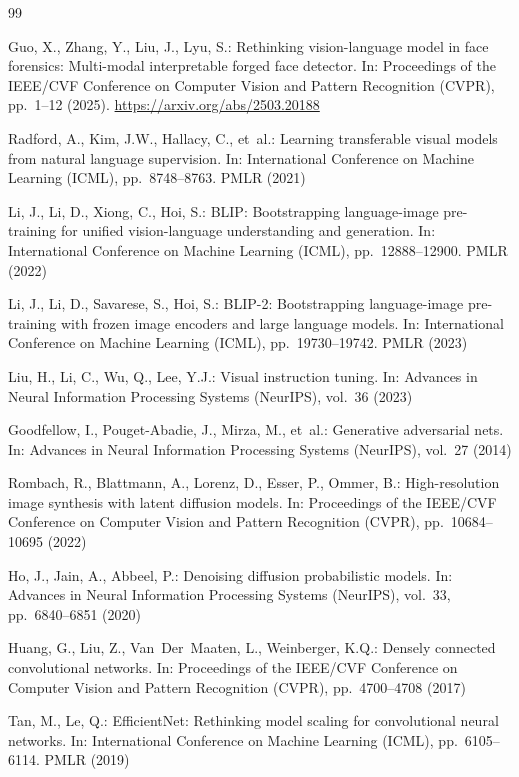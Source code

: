 \documentclass[pdflatex,sn-mathphys-num]{sn-jnl}
\begin{document}
\begin{thebibliography}{99}

Guo, X., Zhang, Y., Liu, J., Lyu, S.:
Rethinking vision-language model in face forensics: Multi-modal interpretable forged face detector.
In: Proceedings of the IEEE/CVF Conference on Computer Vision and Pattern Recognition (CVPR), pp.~1--12 (2025).
\url{https://arxiv.org/abs/2503.20188}

Radford, A., Kim, J.W., Hallacy, C., et~al.:
Learning transferable visual models from natural language supervision.
In: International Conference on Machine Learning (ICML), pp.~8748--8763. PMLR (2021)

Li, J., Li, D., Xiong, C., Hoi, S.:
BLIP: Bootstrapping language-image pre-training for unified vision-language understanding and generation.
In: International Conference on Machine Learning (ICML), pp.~12888--12900. PMLR (2022)

Li, J., Li, D., Savarese, S., Hoi, S.:
BLIP-2: Bootstrapping language-image pre-training with frozen image encoders and large language models.
In: International Conference on Machine Learning (ICML), pp.~19730--19742. PMLR (2023)

Liu, H., Li, C., Wu, Q., Lee, Y.J.:
Visual instruction tuning.
In: Advances in Neural Information Processing Systems (NeurIPS), vol.~36 (2023)

Goodfellow, I., Pouget-Abadie, J., Mirza, M., et~al.:
Generative adversarial nets.
In: Advances in Neural Information Processing Systems (NeurIPS), vol.~27 (2014)

Rombach, R., Blattmann, A., Lorenz, D., Esser, P., Ommer, B.:
High-resolution image synthesis with latent diffusion models.
In: Proceedings of the IEEE/CVF Conference on Computer Vision and Pattern Recognition (CVPR), pp.~10684--10695 (2022)

Ho, J., Jain, A., Abbeel, P.:
Denoising diffusion probabilistic models.
In: Advances in Neural Information Processing Systems (NeurIPS), vol.~33, pp.~6840--6851 (2020)

Huang, G., Liu, Z., Van~Der~Maaten, L., Weinberger, K.Q.:
Densely connected convolutional networks.
In: Proceedings of the IEEE/CVF Conference on Computer Vision and Pattern Recognition (CVPR), pp.~4700--4708 (2017)

Tan, M., Le, Q.:
EfficientNet: Rethinking model scaling for convolutional neural networks.
In: International Conference on Machine Learning (ICML), pp.~6105--6114. PMLR (2019)


\end{thebibliography}
\end{document}
